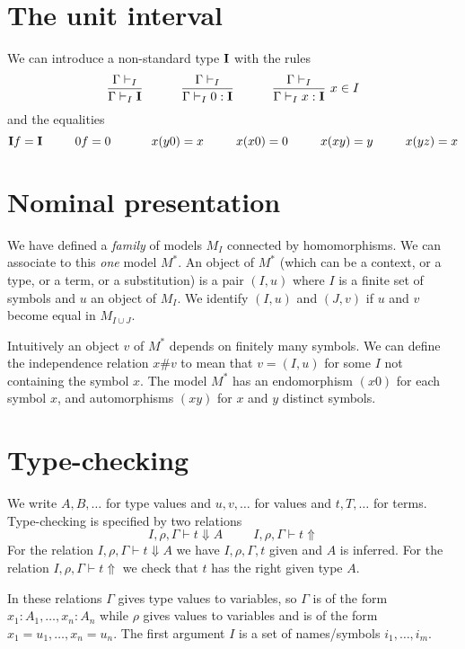 \documentclass[10pt,a4paper]{article}
\newcommand{\UI}{{\bf I}}
\begin{document}
\section{The unit interval}
 
 We can introduce a non-standard type $\UI$ with the rules
$$
\frac{\Gamma\vdash_I}{\Gamma\vdash_I \UI}~~~~~~~~~\frac{\Gamma\vdash_I}{\Gamma\vdash_I 0:\UI}~~~~~~~~~
\frac{\Gamma\vdash_I}{\Gamma\vdash_I x:\UI}~{x\in I}
$$
and the equalities
$$
\UI f = \UI~~~~~~~~0f = 0~~~~~~~~~~x(y0) = x~~~~~~~~x(x0) = 0~~~~~~~~x(xy) = y~~~~~~~~x(yz) = x
$$



\section{Nominal presentation}

 We have defined a {\em family} of models $M_I$ connected by homomorphisms.
We can associate to this {\em one} model $M^*$. An object of $M^*$ (which can
be a context, or a type, or a term, or a substitution) is a pair $(I,u)$
where $I$ is a finite set of symbols and $u$ an object of $M_I$. We identify
$(I,u)$ and $(J,v)$ if $u$ and $v$ become equal in $M_{I\cup J}$.

\medskip

 Intuitively an object $v$ of $M^*$ depends on finitely many symbols. We can 
define the independence relation $x\#v$ to mean that $v = (I,u)$ for some $I$
not containing the symbol $x$.
The model $M^*$ has an endomorphism $(x0)$ for each symbol $x$, and automorphisms
$(xy)$ for $x$ and $y$ distinct symbols.

\section{Type-checking}

 We write $A,B,\dots$ for type values and $u,v,\dots$ for values and $t,T,\dots$ for terms.
Type-checking is specified by two relations
$$
I,\rho,\Gamma\vdash t\Downarrow A~~~~~~~~~~~I,\rho,\Gamma\vdash t\Uparrow
$$
For the relation $I,\rho,\Gamma\vdash t\Downarrow A$ we have $I,\rho,\Gamma,t$ given and
$A$ is inferred. For the relation $I,\rho,\Gamma\vdash t\Uparrow$ we check that $t$ has
the right given type $A$.

 In these relations $\Gamma$ gives type values to variables, so $\Gamma$ is of the form
$x_1:A_1,\dots,x_n:A_n$ while $\rho$ gives values to variables and is of the form
$x_1 = u_1,\dots,x_n=u_n$. The first argument $I$ is a set of names/symbols
$i_1,\dots,i_m$. 
\end{document}
